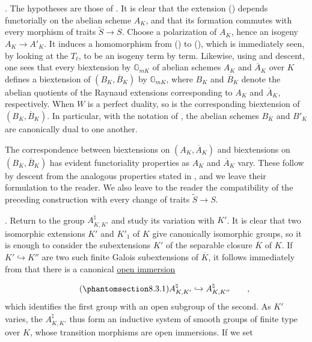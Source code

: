 
\medskip
\noindent
{}. The hypotheses are those of . It is clear that the extension
() depends functorially on the abelian scheme $A_K$, and that
its formation commutes with every morphism of traits
$\widetilde S\longrightarrow S$. Choose a polarization of $A_K$,
hence an isogeny $A_K\longrightarrow A'_K$. It induces a
homomorphism from () to (), which is immediately seen, by
looking at the $T_\ell$, to be an isogeny term by term. Likewise,
using  and descent, one sees that every biextension by
$\mathbb{G}_{mK}$ of abelian schemes $A_K$ and $\overline A_K$ over
$K$ defines a biextension of $(B_K,\overline B_K)$ by
$\mathbb{G}_{mK}$, where $B_K$ and $\overline B_K$ denote the
abelian quotients of the Raynaud extensions corresponding to $A_K$
and $\overline A_K$, respectively. When $W$ is a perfect duality, so
is the corresponding biextension of $(B_K,\overline B_K)$. In
particular, with the notation of , the abelian schemes $B_K$ and
$B'_K$ are canonically dual to one another.

The correspondence between biextensions on $(A_K,\overline A_K)$
and biextensions on $(B_K,\overline B_K)$ has evident functoriality
properties as $A_K$ and $\overline A_K$ vary. These follow by descent
from the analogous properties stated in , and we leave their
formulation to the reader. We also leave to the reader the
compatibility of the preceding construction with every change of
traits $\widetilde S\longrightarrow S$.

\medskip
\noindent
{}. Return to the group $A_{K,K'}^{\natural}$ and study its
variation with $K'$. It is clear that two isomorphic extensions
$K'$ and $K'_1$ of $K$ give canonically isomorphic groups, so it is
enough to consider the subextensions $K'$ of the separable closure
$\overline K$ of $K$. If $K'\hookrightarrow K''$ are two such finite
Galois subextensions of $\overline K$, it follows immediately from
 that there is a canonical \underline{open immersion}

\begin{equation}\tag{\SGARefTarget{sga7.sga7i.eix.n8-3-1}{8.3.1}}
A^{\natural}_{K,K'} \hookrightarrow A^{\natural}_{K,K''}
 \qquad ,
\end{equation}
which identifies the first group with an open subgroup of the
second. As $K'$ varies, the $A^{\natural}_{K,K'}$ thus form an
inductive system of smooth groups of finite type over $K$, whose
transition morphisms are open immersions. If we set

